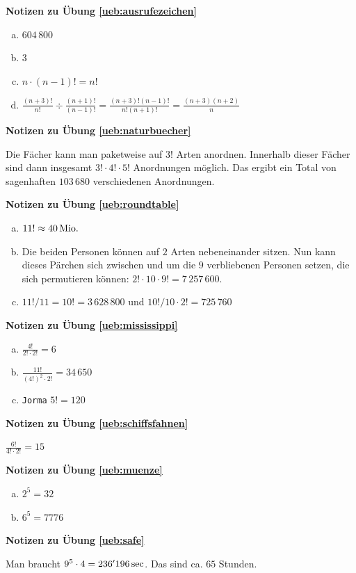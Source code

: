 \documentclass[%
<<<<<<< Updated upstream
<<<<<<< Updated upstream
11pt,%
twoside,%
titlepage,%
german,%
=======
=======
>>>>>>> Stashed changes
11pt,%
twoside,%
titlepage,%
swissgerman,%
<<<<<<< Updated upstream
>>>>>>> Stashed changes
=======
>>>>>>> Stashed changes
headsepline%
]{scrartcl}
\newcommand{\faReturnGray}{\textcolor{gray}{\faMailReply}} %
\theoremstyle{definition}
\theoremstyle{plain}
\newcommand{\concatueb}[1]{ueb:#1}%
\newcommand{\concatlsg}[1]{lsg:#1}%
\newenvironment{lsg}[1]{%
    \par\noindent\textbf{Notizen zu Übung \ref{\concatueb{#1}}}\label{\concatlsg{#1}}
    \hfill\hyperref[\concatueb{#1}]{\faReturnGray}\par %
}{%
    \par%
}
\newcommand{\concatueb}[1]{ueb:#1}%
\newcommand{\concatlsg}[1]{lsg:#1}%
\newenvironment{lsg}[1]{%
    \par\noindent\textbf{Notizen zu Übung \ref{\concatueb{#1}}.}%
    \label{\concatlsg{#1}}
}{%
    \par%
}
\begin{document}
\begin{lsg}{ausrufezeichen}
\begin{enumerate}[a)]
\item $604\,800$
\item $3$
\item $n\cdot(n-1)!=n!$
\item $\frac{(n+3)!}{n!}\div\frac{(n+1)!}{(n-1)!}=\frac{(n+3)!(n-1)!}{n!(n+1)!}=\frac{(n+3)(n+2)}{n}$
\end{enumerate}
\end{lsg}
\begin{lsg}{naturbuecher}
Die F\"acher kann man paketweise auf $3!$ Arten anordnen. Innerhalb dieser F\"acher sind dann insgesamt $3!\cdot4!\cdot5!$ Anordnungen m\"oglich. Das ergibt ein Total von sagenhaften $103\,680$ verschiedenen Anordnungen.
\end{lsg}
\begin{lsg}{roundtable}
\begin{enumerate}[a)]
\item $11!\approx\unit[40]{Mio.}$
\item Die beiden Personen k\"onnen auf $2$ Arten nebeneinander sitzen. Nun kann dieses P\"archen sich zwischen und um die $9$ verbliebenen Personen setzen, die sich permutieren k\"onnen: $2!\cdot10\cdot 9!=7\,257\,600$.
\item $11!/11=10!=3\,628\,800$ und $10!/10\cdot2!=725\,760$
\end{enumerate}
\end{lsg}
\begin{lsg}{mississippi}
\begin{enumerate}[a)]
\item $\frac{4!}{2!\cdot2!}=6$
\item $\frac{11!}{(4!)^{2}\cdot2!}=34\,650$
\item \texttt{Jorma} $5!=120$
\end{enumerate}
\end{lsg}
\begin{lsg}{schiffsfahnen}
$\frac{6!}{4!\cdot 2!}=15$
\end{lsg}
\begin{lsg}{muenze}
\begin{enumerate}[a)]
\item $2^{5}=32$
\item $6^{5}=7776$
\end{enumerate}
\end{lsg}
\begin{lsg}{safe}
Man braucht $9^{5}\cdot4=\unit[236'196]{sec}$. Das sind ca. $65$ Stunden.
\end{lsg}
\end{document}
